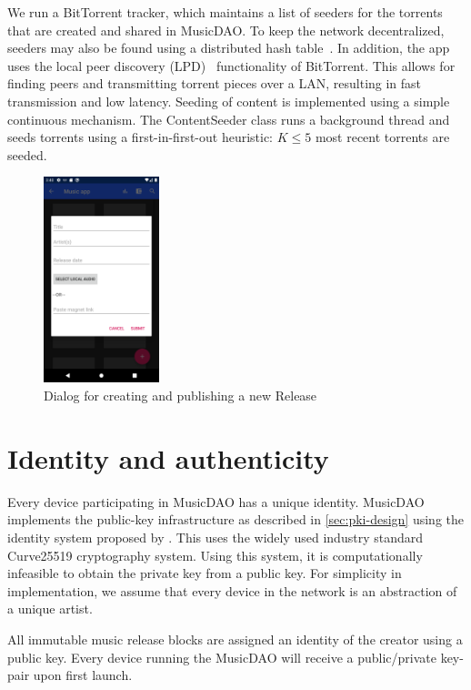 We run a BitTorrent tracker, which maintains a list of seeders for the torrents that are created and shared in MusicDAO. To keep the network decentralized, seeders may also be found using a distributed hash table~\citep{bittorrentbep5dht}. In addition, the app uses the local peer discovery (LPD)~\citep{bittorrentbep142015} functionality of BitTorrent. This allows for finding peers and transmitting torrent pieces over a LAN, resulting in fast transmission and low latency.
\label{sec:content-seeding}
Seeding of content is implemented using a simple continuous mechanism. The ContentSeeder class runs a background thread and seeds torrents using a first-in-first-out heuristic: $K\leq 5$ most recent torrents are seeded.

\begin{figure}
    \centering
    \includegraphics[width=0.3\textwidth]{implementation/screenshot-select-tracks.png}
    \caption{Dialog for creating and publishing a new Release}
    \label{fig:submit-release-dialog}
\end{figure}

\section{Identity and authenticity}
\label{sec:identity-authenticity}
Every device participating in MusicDAO has a unique identity. MusicDAO implements the public-key infrastructure as described in \ref{sec:pki-design} using the identity system proposed by \cite{mattskala2020}. This uses the widely used industry standard Curve25519 cryptography system. Using this system, it is computationally infeasible to obtain the private key from a  public key. For simplicity in implementation, we assume that every device in the network is an abstraction of a unique artist.

All immutable music release blocks are assigned an identity of the creator using a public key. Every device running the MusicDAO will receive a public/private key-pair upon first launch. 


